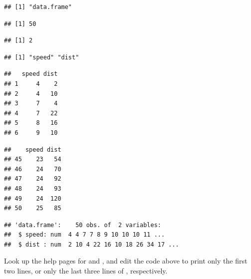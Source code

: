 \documentclass[krantz2]{krantz}\usepackage{knitr}
\begin{document}
\begin{knitrout}\footnotesize
{}\color{fgcolor}\begin{kframe}
\begin{alltt}
\end{alltt}
\begin{verbatim}
## [1] "data.frame"
\end{verbatim}
\begin{alltt}
\end{alltt}
\begin{verbatim}
## [1] 50
\end{verbatim}
\begin{alltt}
\end{alltt}
\begin{verbatim}
## [1] 2
\end{verbatim}
\begin{alltt}
\end{alltt}
\begin{verbatim}
## [1] "speed" "dist"
\end{verbatim}
\begin{alltt}
\end{alltt}
\begin{verbatim}
##   speed dist
## 1     4    2
## 2     4   10
## 3     7    4
## 4     7   22
## 5     8   16
## 6     9   10
\end{verbatim}
\begin{alltt}
\end{alltt}
\begin{verbatim}
##    speed dist
## 45    23   54
## 46    24   70
## 47    24   92
## 48    24   93
## 49    24  120
## 50    25   85
\end{verbatim}
\begin{alltt}
\end{alltt}
\begin{verbatim}
## 'data.frame':	50 obs. of  2 variables:
##  $ speed: num  4 4 7 7 8 9 10 10 10 11 ...
##  $ dist : num  2 10 4 22 16 10 18 26 34 17 ...
\end{verbatim}
\end{kframe}
\end{knitrout}

\begin{playground}
Look up the help pages for  and , and edit the code above to print only the first two lines, or only the last three lines of , respectively.
\end{playground}
\end{document}
